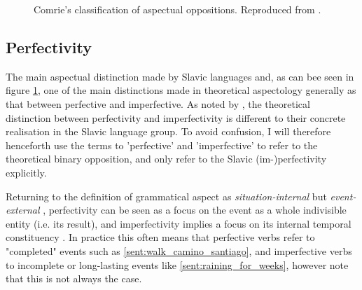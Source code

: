 \begin{figure}
    \centering
    \caption[Comrie's classification of aspectual oppositions]{Comrie's classification of aspectual oppositions. Reproduced from \citet{comrie1976aspect}.}
    \label{fig:comrieaspecttree}
\end{figure}

\subsection*{Perfectivity}
\label{sec:perfectivity}
The main aspectual distinction made by Slavic languages and, as can bee seen in figure \ref{fig:comrieaspecttree}, one of the main distinctions made in theoretical aspectology generally as that between perfective and imperfective. As noted by \citet{Dahl1985TenseAA}, the theoretical distinction between perfectivity and imperfectivity is different to their concrete realisation in the Slavic language group. To avoid confusion, I will therefore henceforth use the terms to 'perfective' and 'imperfective' to refer to the theoretical binary opposition, and only refer to the Slavic (im-)perfectivity explicitly.

Returning to the definition of grammatical aspect as \emph{situation-internal} but \emph{event-external} \citep{kibort2008aspect}, perfectivity can be seen as a focus on the event as a whole indivisible entity (i.e. its result), and imperfectivity implies a focus on its internal temporal constituency \citep{comrie1976aspect, wals-65}. In practice this often means that perfective verbs refer to "completed" events such as \ref*{sent:walk_camino_santiago}, and imperfective verbs to incomplete or long-lasting events like \ref{sent:raining_for_weeks}, however note that this is not always the case.

